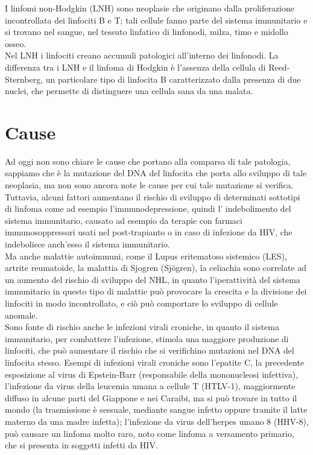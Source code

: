 I linfomi non-Hodgkin (LNH) sono neoplasie che originano dalla proliferazione incontrollata dei linfociti B e T; 
tali cellule fanno parte del sistema immunitario e si trovano nel sangue, nel tessuto linfatico di linfonodi, milza, 
timo e midollo osseo\cite{LNHAIL}.\\ 
Nel LNH i linfociti creano accumuli patologici all’interno dei linfonodi. La differenza tra i LNH e il 
linfoma di Hodgkin è l’assenza della cellula di Reed-Sternberg, un particolare tipo di linfocita B caratterizzato 
dalla presenza di due nuclei, che permette di distinguere una cellula sana da una malata\cite{LNHAIMAC}.\\

\section{Cause}
Ad oggi non sono chiare le cause che portano alla comparsa di tale patologia, sappiamo che è la mutazione del 
DNA del linfocita che porta allo sviluppo di tale neoplasia, ma non sono ancora note le cause per cui tale 
mutazione si verifica.\\ 
Tuttavia, alcuni fattori aumentano il rischio di sviluppo di determinati sottotipi di linfoma come ad esempio 
l’immunodepressione, quindi l’ indebolimento del sistema immunitario, causato ad esempio da terapie con farmaci 
immunosoppressori usati nel post-trapianto o in caso di infezione da HIV, che indebolisce anch’esso 
il sistema immunitario.\\ 

Ma anche malattie autoimmuni, come il Lupus eritematoso sistemico (LES), artrite reumatoide, 
la malattia di Sjogren (Sjögren), la celiachia sono correlate ad un aumento del rischio di sviluppo del NHL, 
in quanto l’iperattività del sistema immunitario in questo tipo di malattie può provocare la crescita e la 
divisione dei linfociti in modo incontrollato, 
e ciò può comportare lo sviluppo di cellule anomale\cite{AMERICANCS}.\\

Sono fonte di rischio anche le infezioni virali croniche, in quanto il sistema immunitario, 
per combattere l’infezione, stimola una maggiore produzione di linfociti, che può aumentare il rischio che si 
verifichino mutazioni nel DNA del linfocita stesso. Esempi di infezioni virali croniche sono l’epatite C, 
la precedente esposizione al virus di Epstein-Barr (responsabile della mononucleosi infettiva), 
l'infezione da virus della leucemia umana a cellule T (HTLV-1), maggiormente diffuso in alcune parti del 
Giappone e nei Caraibi, ma si può trovare in tutto il mondo (la trasmissione è sessuale, mediante sangue infetto 
oppure tramite il latte materno da una madre infetta); l’infezione da virus dell'herpes umano 8 (HHV-8), 
può causare un linfoma molto raro, noto come linfoma a versamento primario, che si presenta in soggetti infetti da HIV.\\

